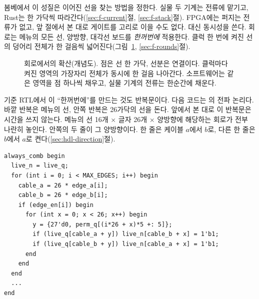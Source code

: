 \Ours 봄베에서 이 성질은 이어진 선을 찾는 방법을 정한다. 실물 두 기계는 전류에 맡기고, Rust는 한 가닥씩
따라간다(\ref{sec:f-current}절, \ref{sec:f-stack}절). FPGA에는 퍼지는 전류가 없고, 앞 절에서 본 대로 게이트를 고리로
이을 수도 없다. 대신 동시성을 쓴다. 회로는 메뉴의 모든 선, 양방향, 대각선 보드를 \emph{한꺼번에} 적용한다. 클럭 한
번에 켜진 선의 덩어리 전체가 한 걸음씩 넓어진다(그림~\ref{fig:g-wave}, \ref{sec:f-rounds}절).

\begin{figure}[ht]
\centering
{}
\caption{회로에서의 확산(개념도). 점은 선 한 가닥, 선분은 연결이다. 클럭마다 켜진 영역의 가장자리 전체가
동시에 한 걸음 나아간다. 소프트웨어는 같은 영역을 점 하나씩 채우고, 실물 기계의 전류는 한순간에 채운다.}
\label{fig:g-wave}
\end{figure}

기준 RTL에서 이 ``한꺼번에''를 만드는 것도 반복문이다. 다음 코드는 의 전파 논리다.
바깥 반복은 메뉴의 선, 안쪽 반복은 26가닥의 선을 돈다. 앞에서 본 대로 이 반복문은 시간을 쓰지 않는다.
메뉴의 선 16개 × 글자 26개 × 양방향에 해당하는 회로가 전부 나란히 놓인다. 안쪽의  두 줄이 그
양방향이다. 한 줄은 케이블 $a$에서 $b$로, 다른 한 줄은 $b$에서 $a$로 켠다(\ref{sec:hdl-direction}절).

\begin{lstlisting}[language=SV,caption={\code{rtl/src/bombe\_core.sv}의 전파 논리(일부).},label={lst:g-spread}]
always_comb begin
  live_n = live_q;
  for (int i = 0; i < MAX_EDGES; i++) begin
    cable_a = 26 * edge_a[i];
    cable_b = 26 * edge_b[i];
    if (edge_en[i]) begin
      for (int x = 0; x < 26; x++) begin
        y = {27'd0, perm_q[(i*26 + x)*5 +: 5]};
        if (live_q[cable_a + y]) live_n[cable_b + x] = 1'b1;
        if (live_q[cable_b + y]) live_n[cable_a + x] = 1'b1;
      end
    end
  end
  ...
end
\end{lstlisting}

